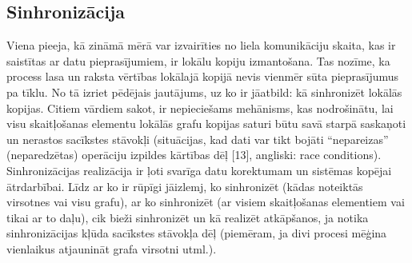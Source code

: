 \subsection{Sinhronizācija}
Viena pieeja, kā zināmā mērā var izvairīties no liela komunikāciju skaita, kas ir saistītas
ar datu pieprasījumiem, ir lokālu kopiju izmantošana. Tas nozīme, ka process lasa un raksta
vērtības lokālajā kopijā nevis vienmēr sūta pieprasījumus pa tīklu. No tā izriet pēdējais
jautājums, uz ko ir jāatbild: kā sinhronizēt lokālās kopijas. Citiem vārdiem sakot, ir nepieciešams
mehānisms, kas nodrošinātu, lai visu skaitļošanas elementu lokālās grafu kopijas saturi būtu
savā starpā saskaņoti un nerastos sacīkstes stāvokļi (situācijas, kad dati var tikt bojāti
“nepareizas” (neparedzētas) operāciju izpildes kārtības dēļ [13], angliski: race conditions).
Sinhronizācijas realizācija ir ļoti svarīga datu korektumam un sistēmas kopējai ātrdarbībai.
Līdz ar ko ir rūpīgi jāizlemj, ko sinhronizēt (kādas noteiktās virsotnes vai visu grafu), ar
ko sinhronizēt (ar visiem skaitļošanas elementiem vai tikai ar to daļu), cik bieži sinhronizēt
un kā realizēt atkāpšanos, ja notika sinhronizācijas kļūda sacīkstes stāvokļa dēļ (piemēram,
ja divi procesi mēģina vienlaikus atjaunināt grafa virsotni utml.).
